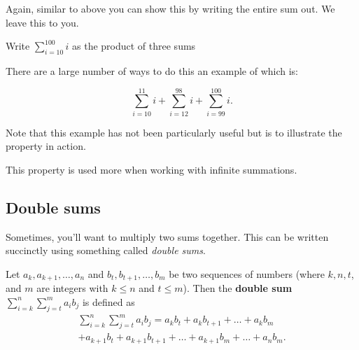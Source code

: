 \documentclass[
  12pt,
  a4paper, oneside]{starmastarticle}
\begin{document}
Again, similar to above you can show this by writing the entire sum out.
We leave this to you.

\begin{tcolorbox}[enhanced jigsaw, colframe=quarto-callout-note-color-frame, breakable, rightrule=.15mm, opacityback=0, bottomrule=.15mm, colback=white, toprule=.15mm, leftrule=.75mm, left=2mm, arc=.35mm]
\begin{minipage}[t]{5.5mm}
\textcolor{quarto-callout-note-color}{\faInfo}
\end{minipage}%
\begin{minipage}[t]{\textwidth - 5.5mm}
Write \(\sum_{i=10}^{100}i\) as the product of three sums

There are a large number of ways to do this an example of which is:

\[\sum_{i=10}^{11} i + \sum_{i=12}^{98} i + \sum_{i=99}^{100} i.\]

Note that this example has not been particularly useful but is to
illustrate the property in action.

This property is used more when working with infinite
summations.\end{minipage}%
\end{tcolorbox}

\hypertarget{double-sums}{%
\subsection{Double sums}\label{double-sums}}

Sometimes, you'll want to multiply two sums together. This can be
written succinctly using something called \emph{double sums}.

\begin{tcolorbox}[enhanced jigsaw, colframe=quarto-callout-note-color-frame, breakable, rightrule=.15mm, opacityback=0, bottomrule=.15mm, colback=white, toprule=.15mm, leftrule=.75mm, left=2mm, arc=.35mm]
\begin{minipage}[t]{5.5mm}
\textcolor{quarto-callout-note-color}{\faInfo}
\end{minipage}%
\begin{minipage}[t]{\textwidth - 5.5mm}
Let \(a_{k},a_{k+1},\ldots,a_n\) and \(b_t,b_{t+1},\ldots,b_m\) be two
sequences of numbers (where \(k,n,t\), and \(m\) are integers with
\(k \leq n\) and \(t \leq m\)). Then the \textbf{double sum}
\(\sum_{i=k}^n\sum_{j=t}^m a_i b_j\) is defined as
\[\begin{multline*} \sum_{i=k}^n\sum_{j=t}^m a_i b_j = a_kb_t + a_kb_{t+1} + \ldots + a_kb_m \\+ a_{k+1}b_t + a_{k+1}b_{t+1} + \ldots + a_{k+1}b_m + \ldots + a_nb_m.\end{multline*}\]\end{minipage}%
\end{tcolorbox}
\end{document}
